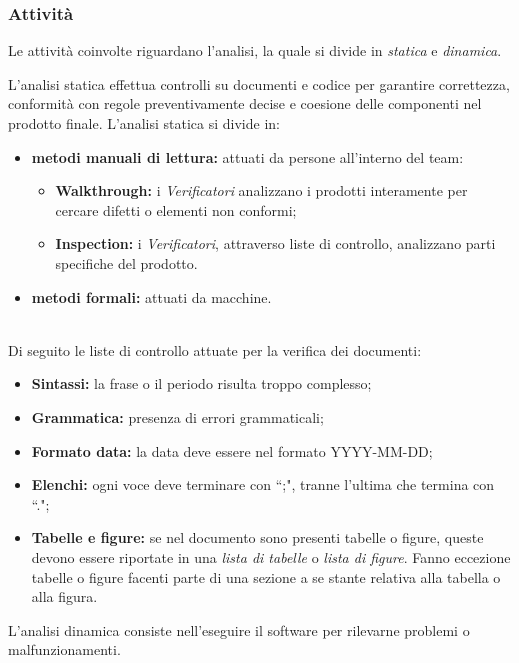 \subsubsection{Attività}
Le attività coinvolte riguardano l'analisi, la quale si divide in \textit{statica} e \textit{dinamica}.

L'analisi statica effettua controlli su documenti e codice per garantire correttezza, conformità con regole preventivamente decise e coesione delle componenti nel prodotto finale.
L'analisi statica si divide in:
\begin{itemize}
	\item \textbf{metodi manuali di lettura:} attuati da persone all'interno del team:
	\begin{itemize}
		\item \textbf{Walkthrough:} i \textit{Verificatori} analizzano i prodotti interamente per cercare difetti o elementi non conformi;
		\item \textbf{Inspection:} i \textit{Verificatori}, attraverso liste di controllo, analizzano parti specifiche del prodotto.
	\end{itemize}
	\item \textbf{metodi formali:} attuati da macchine.
\end{itemize}
\mbox{}\\
Di seguito le liste di controllo attuate per la verifica dei documenti:
\begin{itemize}
	\item \textbf{Sintassi:} la frase o il periodo risulta troppo complesso;
	\item \textbf{Grammatica:} presenza di errori grammaticali;
	\item \textbf{Formato data:} la data deve essere nel formato YYYY-MM-DD;
	\item \textbf{Elenchi:} ogni voce deve terminare con ``;", tranne l'ultima che termina con ``.";
	\item \textbf{Tabelle e figure:} se nel documento sono presenti tabelle o figure, queste devono essere riportate in una \textit{lista di tabelle} o \textit{lista di figure}. Fanno eccezione tabelle o figure facenti parte di una sezione a se stante relativa alla tabella o alla figura.
\end{itemize}



\label{3.4.4.2}
L'analisi dinamica consiste nell'eseguire il software per rilevarne problemi o malfunzionamenti.

